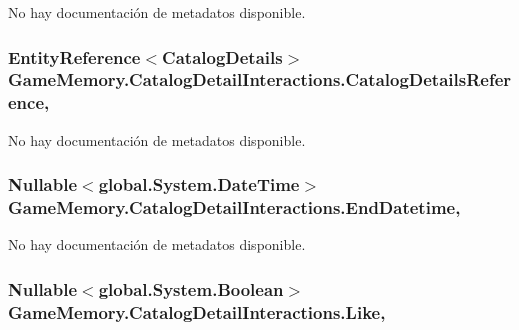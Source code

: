 No hay documentación de metadatos disponible. 

\hypertarget{class_game_memory_1_1_catalog_detail_interactions_a3b322f224a3556ae0a67754c37dec51d}{
\subsubsection[{Catalog\-Details\-Reference}]{\setlength{\rightskip}{0pt plus 5cm}Entity\-Reference$<${\bf Catalog\-Details}$>$ Game\-Memory.\-Catalog\-Detail\-Interactions.\-Catalog\-Details\-Reference\hspace{0.3cm}{\ttfamily [get]}, {\ttfamily [set]}}}\label{class_game_memory_1_1_catalog_detail_interactions_a3b322f224a3556ae0a67754c37dec51d}


No hay documentación de metadatos disponible. 

\hypertarget{class_game_memory_1_1_catalog_detail_interactions_a14d6e49b9317999c0c9fb466c863b98a}{
\subsubsection[{End\-Datetime}]{\setlength{\rightskip}{0pt plus 5cm}Nullable$<$global.\-System.\-Date\-Time$>$ Game\-Memory.\-Catalog\-Detail\-Interactions.\-End\-Datetime\hspace{0.3cm}{\ttfamily [get]}, {\ttfamily [set]}}}\label{class_game_memory_1_1_catalog_detail_interactions_a14d6e49b9317999c0c9fb466c863b98a}


No hay documentación de metadatos disponible. 

\hypertarget{class_game_memory_1_1_catalog_detail_interactions_a4f0e09f1191b173af90719683f166595}{
\subsubsection[{Like}]{\setlength{\rightskip}{0pt plus 5cm}Nullable$<$global.\-System.\-Boolean$>$ Game\-Memory.\-Catalog\-Detail\-Interactions.\-Like\hspace{0.3cm}{\ttfamily [get]}, {\ttfamily [set]}}}\label{class_game_memory_1_1_catalog_detail_interactions_a4f0e09f1191b173af90719683f166595}


